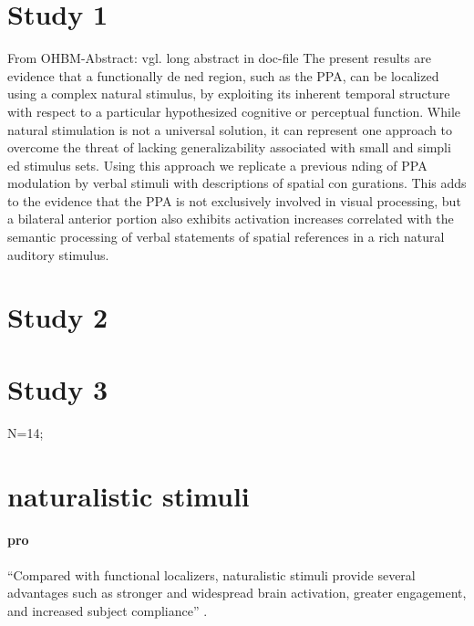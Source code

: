 \section{Study 1}
%
From OHBM-Abstract: vgl. long abstract in doc-file
%
The present results are evidence that a functionally de ned region, such as the
PPA, can be localized using a complex natural stimulus, by exploiting its
inherent temporal structure with respect to a particular hypothesized cognitive
or perceptual function.
%
While natural stimulation is not a universal solution, it can represent one
approach to overcome the threat of lacking generalizability associated with
small and simpli ed stimulus sets.
%
Using this approach we replicate a previous nding of PPA modulation by verbal
stimuli with descriptions of spatial con gurations.
%
This adds to the evidence that the PPA is not exclusively involved in visual
processing, but a bilateral anterior portion also exhibits activation increases
correlated with the semantic processing of verbal statements of spatial
references in a rich natural auditory stimulus.


\section{Study 2}



\section{Study 3}

N=14;


\section{naturalistic stimuli}

\paragraph{pro}




%
``Compared with functional localizers, naturalistic stimuli provide several
advantages such as stronger and widespread brain activation, greater engagement,
and increased subject compliance'' \citep{jiahui2020predicting}.

